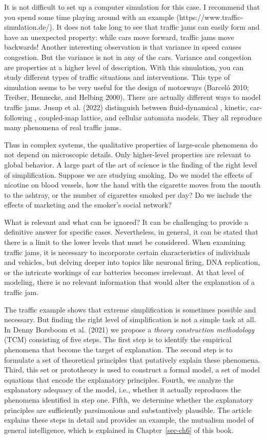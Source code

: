 \documentclass[
  a4paper,
  DIV=11,
  numbers=noendperiod]{scrreprt}
\begin{document}
It is not difficult to set up a computer simulation for this case. I
recommend that you spend some time playing around with an example
(https://www.traffic-simulation.de/). It does not take long to see that
traffic jams can easily form and have an unexpected property: while cars
move forward, traffic jams move backwards! Another interesting
observation is that variance in speed causes congestion. But the
variance is not in any of the cars. Variance and congestion are
properties at a higher level of description. With this simulation, you
can study different types of traffic situations and interventions. This
type of simulation seems to be very useful for the design of motorways
(Barceló 2010; Treiber, Hennecke, and Helbing 2000). There are actually
different ways to model traffic jams. Jusup et al. (2022) distinguish
between fluid-dynamical , kinetic, car-following , coupled-map lattice,
and cellular automata models. They all reproduce many phenomena of real
traffic jams.

Thus in complex systems, the qualitative properties of large-scale
phenomena do not depend on microscopic details. Only higher-level
properties are relevant to global behavior. A large part of the art of
science is the finding of the right level of simplification. Suppose we
are studying smoking. Do we model the effects of nicotine on blood
vessels, how the hand with the cigarette moves from the mouth to the
ashtray, or the number of cigarettes smoked per day? Do we include the
effects of marketing and the smoker's social network?

What is relevant and what can be ignored? It can be challenging to
provide a definitive answer for specific cases. Nevertheless, in
general, it can be stated that there is a limit to the lower levels that
must be considered. When examining traffic jams, it is necessary to
incorporate certain characteristics of individuals and vehicles, but
delving deeper into topics like neuronal firing, DNA replication, or the
intricate workings of car batteries becomes irrelevant. At that level of
modeling, there is no relevant information that would alter the
explanation of a traffic jam.

The traffic example shows that extreme simplification is sometimes
possible and necessary. But finding the right level of simplification is
not a simple task at all. In Denny Borsboom et al. (2021) we propose a
\emph{theory construction methodology} (TCM) consisting of five steps.
The first step is to identify the empirical phenomena that become the
target of explanation. The second step is to formulate a set of
theoretical principles that putatively explain these phenomena. Third,
this set or prototheory is used to construct a formal model, a set of
model equations that encode the explanatory principles. Fourth, we
analyze the explanatory adequacy of the model, i.e., whether it actually
reproduces the phenomena identified in step one. Fifth, we determine
whether the explanatory principles are sufficiently parsimonious and
substantively plausible. The article explains these steps in detail and
provides an example, the mutualism model of general intelligence, which
is explained in Chapter~\ref{sec-ch6} of this book.
\end{document}
